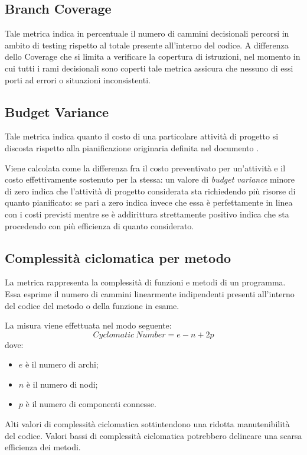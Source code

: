 \subsection{Branch Coverage}
Tale metrica indica in percentuale il numero di cammini decisionali percorsi in ambito di testing rispetto al totale presente all'interno del codice. A differenza dello  Coverage che si limita a verificare la copertura di istruzioni, nel momento in cui tutti i rami decisionali sono coperti tale metrica assicura che nessuno di essi porti ad errori o situazioni inconsistenti.


\subsection{Budget Variance}
Tale metrica indica quanto il costo di una particolare attività di progetto si discosta rispetto alla pianificazione originaria definita nel documento \PdP. 

Viene calcolata come la differenza fra il costo preventivato per un'attività e il costo effettivamente sostenuto per la stessa: un valore di \emph{budget variance} minore di zero indica che l'attività di progetto considerata sta richiedendo più risorse di quanto pianificato: se pari a zero indica invece che essa è perfettamente in linea con i costi previsti mentre se è addirittura strettamente positivo indica che sta procedendo con più efficienza di quanto considerato.


\subsection{Complessità ciclomatica per metodo}
La metrica rappresenta la complessità di funzioni e metodi di un programma. Essa esprime il numero di cammini linearmente indipendenti presenti all'interno del codice del metodo o della funzione in esame. 

La misura viene effettuata nel modo seguente:
\begin{equation}
	Cyclomatic \ Number = e - n + 2p
\end{equation}
dove:
\begin{itemize}
	\item $e$ è il numero di archi;
	\item $n$ è il numero di nodi;
	\item $p$ è il numero di componenti connesse.
\end{itemize}
Alti valori di complessità ciclomatica sottintendono una ridotta manutenibilità del codice. Valori bassi di complessità ciclomatica potrebbero delineare una scarsa efficienza dei metodi.


